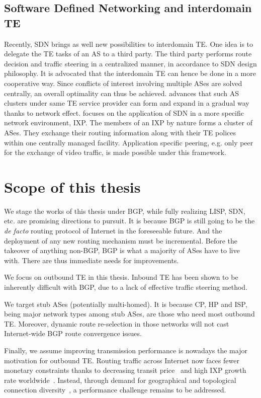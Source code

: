 \subsection{Software Defined Networking and interdomain TE}
Recently, \acf{SDN} brings as well new possibilities to interdomain TE. 
One idea is to delegate the TE tasks of an AS to a third party.
The third party performs route decision and traffic steering in a centralized manner, in accordance to \ac{SDN} design philosophy.
It is advocated that the interdomain TE can hence be done in a more cooperative way.
Since conflicts of interest involving multiple ASes are solved centrally, an overall optimality can thus be achieved.
\citet{Kotronis2012} advances that such AS clusters under same TE service provider can form and expand in a gradual way thanks to network effect.
\citet{Gupta2014} focuses on the application of \ac{SDN} in a more specific network environment, \ac{IXP}.
The members of an IXP by nature forms a cluster of ASes.
They exchange their routing information along with their TE polices within one centrally managed facility. 
Application specific peering, e.g. only peer for the exchange of video traffic, is made possible under this framework.

\section{Scope of this thesis}
We stage the works of this thesis under BGP, while fully realizing \ac{LISP}, \ac{SDN}, etc. are promising directions to pursuit.
It is because BGP is still going to be the \textit{de facto} routing protocol of Internet in the foreseeable future.
And the deployment of any new routing mechanism must be incremental.
Before the takeover of anything non-BGP,  BGP is what a majority of ASes have to live with. 
There are thus immediate needs for improvements.

We focus on outbound TE in this thesis.
Inbound TE has been shown to be inherently difficult with BGP, due to a lack of effective traffic steering method.

We target stub ASes (potentially multi-homed).
It is because \ac{CP}, \ac{HP} and \ac{ISP}, being major network types among stub ASes, are those who need most outbound TE.
Moreover, dynamic route re-selection in those networks will not cast Internet-wide BGP route convergence issues.

Finally, we assume improving transmission performance is nowadays the major motivation for outbound TE.
Routing traffic across Internet now faces fewer monetary constraints thanks to decreasing transit price~\cite{transitprice, drpeering} and high \ac{IXP} growth rate worldwide~\cite{pchixp}.
Instead, through demand for geographical and topological connection diversity~\cite{Chiu2015}, a performance challenge remains to be addressed.

